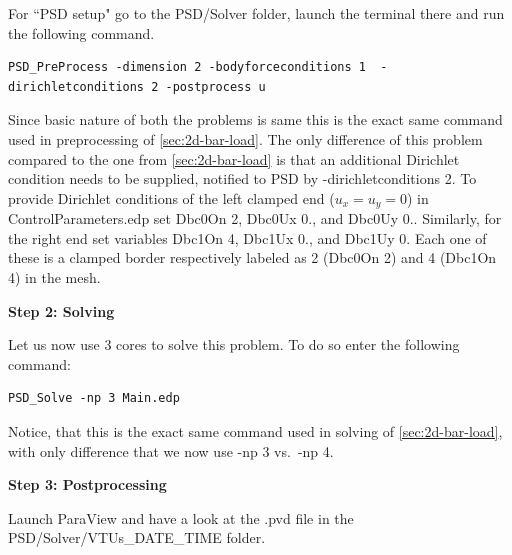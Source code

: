 For ``PSD setup" go to the {\ttfamily PSD/Solver} folder, launch the terminal there and run the following command.
\begin{lstlisting}[style=Linux]
PSD_PreProcess -dimension 2 -bodyforceconditions 1  -dirichletconditions 2 -postprocess u
\end{lstlisting}
%
Since basic nature of both the problems is same this is the exact same command used in preprocessing of \cref{sec:2d-bar-load}. The only difference of this problem compared to the one from \cref{sec:2d-bar-load} is that an additional Dirichlet condition needs to be supplied, notified to PSD by {\ttfamily -dirichletconditions 2}. To provide Dirichlet conditions of the left clamped end ($u_x=u_y=0$) in {\ttfamily ControlParameters.edp} set {\ttfamily Dbc0On 2}, {\ttfamily Dbc0Ux 0.}, and {\ttfamily Dbc0Uy 0.}. Similarly, for the right end set variables {\ttfamily Dbc1On 4}, {\ttfamily Dbc1Ux 0.}, and {\ttfamily Dbc1Uy 0}. Each one of these is a clamped border respectively labeled as 2  ({\ttfamily Dbc0On 2}) and 4 ({\ttfamily Dbc1On 4}) in the mesh.

\textbf{Step 2: Solving}

Let us now use  3 cores to solve this problem. To do so enter the following command:

\begin{lstlisting}[style=Linux]
PSD_Solve -np 3 Main.edp
\end{lstlisting}
%
Notice, that this is the exact same command used in solving of \cref{sec:2d-bar-load}, with only difference that we now use {\ttfamily -np 3} vs.~{\ttfamily -np 4}.


\textbf{Step 3: Postprocessing}

Launch ParaView and have a look at the  {\ttfamily .pvd} file in the  {\ttfamily PSD/Solver/VTUs\_DATE\_TIME} folder. 

